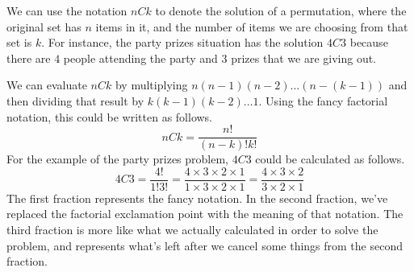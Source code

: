 \documentclass{ximera}
\begin{document}
We can use the notation $nCk$ to denote the solution of a permutation, where the original set has $n$ items in it, and the number of items we are choosing from that set is $k$. For instance, the party prizes situation has the solution $4C3$ because there are $4$ people attending the party and $3$ prizes that we are giving out. 

We can evaluate $nCk$ by multiplying $n (n-1) (n-2) \dots (n-(k-1))$ and then dividing that result by $k (k-1) (k-2) \dots 1$. Using the fancy factorial notation, this could be written as follows.
\[
nCk = \frac{n!}{(n-k)! k!}
\]
For the example of the party prizes problem, $4C3$ could be calculated as follows.
\[
4C3 = \frac{4!}{1!3!} =\frac{4 \times 3 \times 2 \times 1}{1 \times 3 \times 2 \times 1} =  \frac{4 \times 3 \times 2}{3 \times 2 \times 1}
\]
The first fraction represents the fancy notation. In the second fraction, we've replaced the factorial exclamation point with the meaning of that notation. The third fraction is more like what we actually calculated in order to solve the problem, and represents what's left after we cancel some things from the second fraction.
\end{document}
